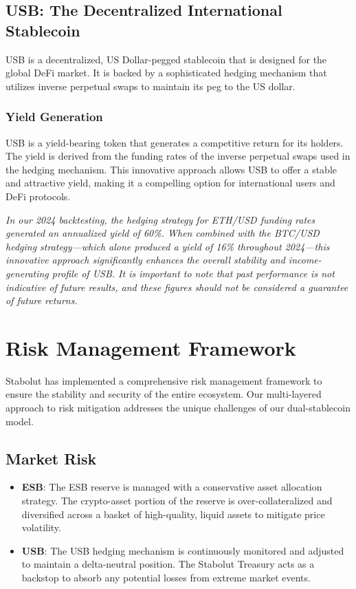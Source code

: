 \subsection{USB: The Decentralized International Stablecoin}
USB is a decentralized, US Dollar-pegged stablecoin that is designed for the global DeFi market. It is backed by a sophisticated hedging mechanism that utilizes inverse perpetual swaps to maintain its peg to the US dollar.

\subsubsection{Yield Generation}
USB is a yield-bearing token that generates a competitive return for its holders. The yield is derived from the funding rates of the inverse perpetual swaps used in the hedging mechanism. This innovative approach allows USB to offer a stable and attractive yield, making it a compelling option for international users and DeFi protocols.

\textit{In our 2024 backtesting, the hedging strategy for ETH/USD funding rates generated an annualized yield of 60\%. When combined with the BTC/USD hedging strategy—which alone produced a yield of 16\% throughout 2024—this innovative approach significantly enhances the overall stability and income-generating profile of USB. It is important to note that past performance is not indicative of future results, and these figures should not be considered a guarantee of future returns.}

\section{Risk Management Framework}
Stabolut has implemented a comprehensive risk management framework to ensure the stability and security of the entire ecosystem. Our multi-layered approach to risk mitigation addresses the unique challenges of our dual-stablecoin model.

\subsection{Market Risk}
\begin{itemize}
    \item \textbf{ESB}: The ESB reserve is managed with a conservative asset allocation strategy. The crypto-asset portion of the reserve is over-collateralized and diversified across a basket of high-quality, liquid assets to mitigate price volatility.
    \item \textbf{USB}: The USB hedging mechanism is continuously monitored and adjusted to maintain a delta-neutral position. The Stabolut Treasury acts as a backstop to absorb any potential losses from extreme market events.
\end{itemize}

